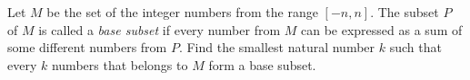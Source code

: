 Let $M$ be the set of the integer numbers from the range $[-n, n]$. The subset $P$ of $M$ is called a \textit{base subset} if every number from $M$ can be expressed as a sum of some different numbers from $P$. Find the smallest natural number $k$ such that every $k$ numbers that belongs to $M$ form a base subset.